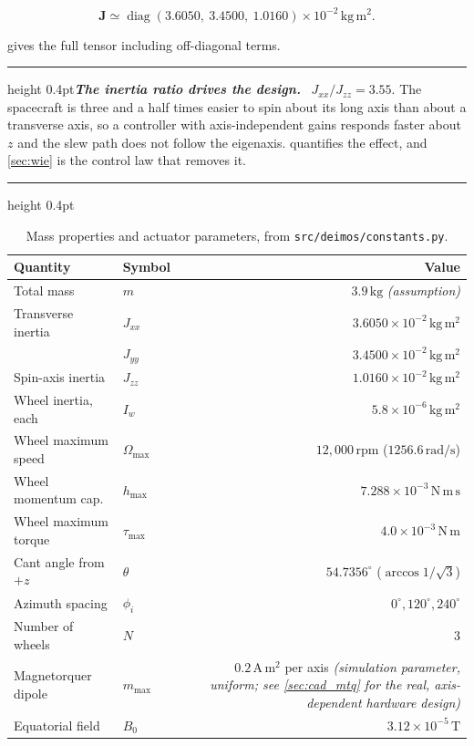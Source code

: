 \documentclass[conference,10pt,a4paper]{IEEEtran}
\newcommand{\remarkrule}{\par\nobreak\vspace{2pt}%
  \hrule height 0.4pt\vspace{4pt}\nobreak}
\newenvironment{keybox}[1][Result]
  {\par\medskip\remarkrule\noindent\small\textbf{\textit{#1.}}\ \ignorespaces}
  {\par\vspace{3pt}\hrule height 0.4pt\par\medskip\ignorespacesafterend}
\newcommand{\NOTE}[1]{{\small\textit{(#1)}}}
\newcommand{\NOTE}[1]{}
\newcommand{\mat}[1]{\bm{#1}}
\newcommand{\unit}[1]{\ensuremath{\,\mathrm{#1}}}
\DeclareMathOperator{\diag}{diag}
\begin{document}
\begin{equation}
\mat{J} \simeq \diag\!\left(3.6050,\ 3.4500,\ 1.0160\right)\times10^{-2}
\unit{kg\,m^2}.
\label{eq:inertia}
\end{equation}

 gives the full tensor including off-diagonal terms.

\begin{keybox}[The inertia ratio drives the design]
$J_{xx}/J_{zz}=3.55$. The spacecraft is three and a half times easier to spin
about its long axis than about a transverse axis, so a controller with
axis-independent gains responds faster about $z$ and the slew path does not
follow the eigenaxis.  quantifies the effect, and
\cref{sec:wie} is the control law that removes it.
\end{keybox}

\begin{table}[!t]
\centering
\caption{Mass properties and actuator parameters, from
\texttt{src/deimos/constants.py}.}
\label{tab:massprops}
\footnotesize
\begin{tabular}{@{}llr@{}}
\toprule
\textbf{Quantity} & \textbf{Symbol} & \textbf{Value} \\
\midrule
Total mass            & $m$              & $3.9\unit{kg}$ \NOTE{assumption} \\
Transverse inertia    & $J_{xx}$         & $3.6050\times10^{-2}\unit{kg\,m^2}$ \\
                      & $J_{yy}$         & $3.4500\times10^{-2}\unit{kg\,m^2}$ \\
Spin-axis inertia     & $J_{zz}$         & $1.0160\times10^{-2}\unit{kg\,m^2}$ \\
\midrule
Wheel inertia, each   & $I_w$            & $5.8\times10^{-6}\unit{kg\,m^2}$ \\
Wheel maximum speed   & $\Omega_\text{max}$ & $12{,}000\unit{rpm}$ ($1256.6\unit{rad/s}$) \\
Wheel momentum cap.   & $h_\text{max}$   & $7.288\times10^{-3}\unit{N\,m\,s}$ \\
Wheel maximum torque  & $\tau_\text{max}$& $4.0\times10^{-3}\unit{N\,m}$ \\
Cant angle from $+z$  & $\theta$         & $54.7356^\circ$ ($\arccos1/\sqrt3$) \\
Azimuth spacing       & $\phi_i$         & $0^\circ,120^\circ,240^\circ$ \\
Number of wheels      & $N$              & $3$ \\
\midrule
Magnetorquer dipole   & $m_\text{max}$   & $0.2\unit{A\,m^2}$ per axis \NOTE{simulation parameter, uniform; see \cref{sec:cad_mtq} for the real, axis-dependent hardware design} \\
Equatorial field      & $B_0$            & $3.12\times10^{-5}\unit{T}$ \\
\bottomrule
\end{tabular}
\end{table}
\end{document}
